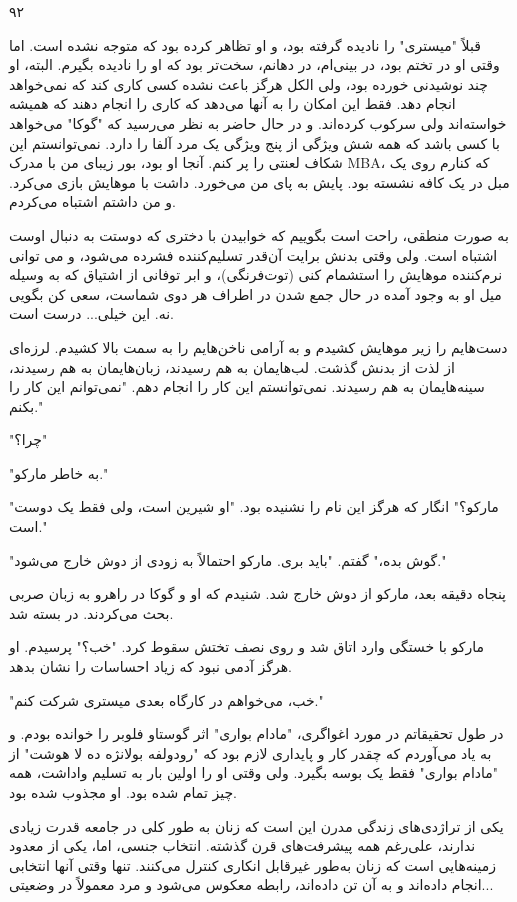 ۹۲

قبلاً "میستری" را نادیده گرفته بود، و او تظاهر کرده بود که متوجه نشده است. اما وقتی او در تختم بود، در بینی‌ام، در دهانم، سخت‌تر بود که او را نادیده بگیرم. البته، او چند نوشیدنی خورده بود، ولی الکل هرگز باعث نشده کسی کاری کند که نمی‌خواهد انجام دهد. فقط این امکان را به آنها می‌دهد که کاری را انجام دهند که همیشه خواسته‌اند ولی سرکوب کرده‌اند. و در حال حاضر به نظر می‌رسید که "گوکا" می‌خواهد با کسی باشد که همه شش ویژگی از پنج ویژگی یک مرد آلفا را دارد. نمی‌توانستم این شکاف لعنتی را پر کنم. آنجا او بود، بور زیبای من با مدرک MBA، که کنارم روی یک مبل در یک کافه نشسته بود. پایش به پای من می‌خورد. داشت با موهایش بازی می‌کرد. و من داشتم اشتباه می‌کردم.

به صورت منطقی، راحت است بگوییم که خوابیدن با دختری که دوستت به دنبال اوست اشتباه است. ولی وقتی بدنش برایت آن‌قدر تسلیم‌کننده فشرده می‌شود، و می توانی نرم‌کننده موهایش را استشمام کنی (توت‌فرنگی)، و ابر توفانی از اشتیاق که به وسیله میل او به وجود آمده در حال جمع شدن در اطراف هر دوی شماست، سعی کن بگویی نه. این خیلی... درست است. 

دست‌هایم را زیر موهایش کشیدم و به آرامی ناخن‌هایم را به سمت بالا کشیدم. لرزه‌ای از لذت از بدنش گذشت. لب‌هایمان به هم رسیدند، زبان‌هایمان به هم رسیدند، سینه‌هایمان به هم رسیدند. نمی‌توانستم این کار را انجام دهم. "نمی‌توانم این کار را بکنم."

"چرا؟"

"به خاطر مارکو."

"مارکو؟" انگار که هرگز این نام را نشنیده بود. "او شیرین است، ولی فقط یک دوست است."

"گوش بده،" گفتم. "باید بری. مارکو احتمالاً به زودی از دوش خارج می‌شود."

پنجاه دقیقه بعد، مارکو از دوش خارج شد. شنیدم که او و گوکا در راهرو به زبان صربی بحث می‌کردند. در بسته شد.

مارکو با خستگی وارد اتاق شد و روی نصف تختش سقوط کرد. "خب؟" پرسیدم. او هرگز آدمی نبود که زیاد احساسات را نشان بدهد.

"خب، می‌خواهم در کارگاه بعدی میستری شرکت کنم."

در طول تحقیقاتم در مورد اغواگری، "مادام بواری" اثر گوستاو فلوبر را خوانده بودم. و به یاد می‌آوردم که چقدر کار و پایداری لازم بود که "رودولفه بولانژه ده لا هوشت" از "مادام بواری" فقط یک بوسه بگیرد. ولی وقتی او را اولین بار به تسلیم واداشت، همه چیز تمام شده بود. او مجذوب شده بود.

یکی از تراژدی‌های زندگی مدرن این است که زنان به طور کلی در جامعه قدرت زیادی ندارند، علی‌رغم همه پیشرفت‌های قرن گذشته. انتخاب جنسی، اما، یکی از معدود زمینه‌هایی است که زنان به‌طور غیرقابل انکاری کنترل می‌کنند. تنها وقتی آنها انتخابی انجام داده‌اند و به آن تن داده‌اند، رابطه معکوس می‌شود و مرد معمولاً در وضعیتی...